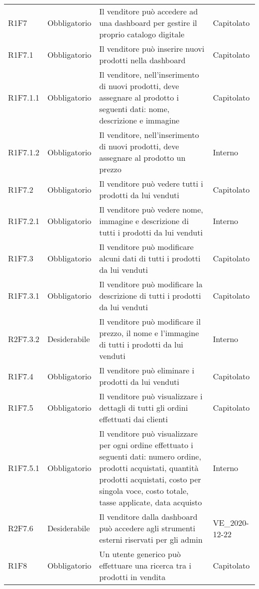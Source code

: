 {\begin{longtable}{C{2.5cm} C{2.8cm} C{6.7cm} C{2.5cm}}
R1F7 & Obbligatorio & Il venditore può accedere ad una dashboard per gestire il proprio catalogo digitale & Capitolato \\
R1F7.1 & Obbligatorio & Il venditore può inserire nuovi prodotti nella dashboard & Capitolato \\
R1F7.1.1 & Obbligatorio & Il venditore, nell'inserimento di nuovi prodotti, deve assegnare al prodotto i seguenti dati: nome, descrizione e immagine & Capitolato \\
R1F7.1.2 & Obbligatorio & Il venditore, nell'inserimento di nuovi prodotti, deve assegnare al prodotto un prezzo & Interno \\ 
R1F7.2 & Obbligatorio & Il venditore può vedere tutti i prodotti da lui venduti & Capitolato \\
R1F7.2.1 & Obbligatorio & Il venditore può vedere nome, immagine e descrizione di tutti i prodotti da lui venduti & Interno \\
R1F7.3 & Obbligatorio & Il venditore può modificare alcuni dati di tutti i prodotti da lui venduti & Capitolato \\
R1F7.3.1 & Obbligatorio & Il venditore può modificare la descrizione di tutti i prodotti da lui venduti & Capitolato \\
R2F7.3.2 & Desiderabile & Il venditore può modificare il prezzo, il nome e l'immagine di tutti i prodotti da lui venduti & Interno \\
R1F7.4 & Obbligatorio & Il venditore può eliminare i prodotti da lui venduti & Capitolato \\
R1F7.5 & Obbligatorio & Il venditore può visualizzare i dettagli di tutti gli ordini effettuati dai clienti & Capitolato \\
R1F7.5.1 & Obbligatorio & Il venditore può visualizzare per ogni ordine effettuato i seguenti dati: numero ordine, prodotti acquistati, quantità prodotti acquistati, costo per singola voce, costo totale, tasse applicate, data acquisto & Interno \\
R2F7.6 & Desiderabile & Il venditore dalla dashboard può accedere agli strumenti esterni riservati per gli admin & VE\_2020-12-22 \\


R1F8 & Obbligatorio & Un utente generico può effettuare una ricerca tra i prodotti in vendita & Capitolato \\



\end{longtable}}
